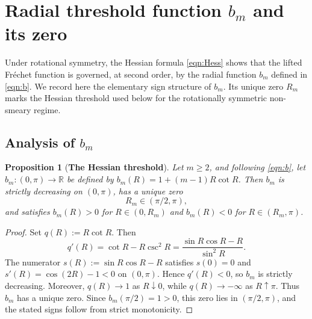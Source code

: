 \documentclass{amsart}
\newtheorem{proposition}[theorem]{Proposition}
\theoremstyle{definition}
\theoremstyle{remark}
\newcommand\0{\boldsymbol{0}}
\begin{document}
\section{Radial threshold function \(b_m\) and its zero}
\label{scn:asymptotics-b-h}

Under rotational symmetry, the Hessian formula \eqref{eqn:Hess} shows that the lifted Fr\'echet function is governed, at second order, by the radial function \(b_m\) defined in \eqref{eqn:b}.  We record here the elementary sign structure of \(b_m\).  Its unique zero \(R_m\) marks the Hessian threshold used below for the rotationally symmetric non-smeary regime.

\subsection{Analysis of \(b_m\)}

\begin{proposition}[\textbf{The Hessian threshold}]
\label{prop:zero_bm}
Let \(m\ge2\), and following \eqref{eqn:b}, let \(b_m:(0,\pi)\to\mathbb R\) be defined by \(b_m(R)=1+(m-1)R\cot R\).  Then \(b_m\) is strictly decreasing on \((0,\pi)\), has a unique zero
\begin{equation}\label{eqn:R_m}
    R_m\in(\pi/2,\pi),
\end{equation}
and satisfies \(b_m(R)>0\) for \(R\in(0,R_m)\) and \(b_m(R)<0\) for \(R\in(R_m,\pi)\).
\end{proposition}

\begin{proof}
Set \(q(R):=R\cot R\). Then
\[
    q'(R)=\cot R-R\csc^2R=\frac{\sin R\cos R-R}{\sin^2R}.
\]
The numerator \(s(R):=\sin R\cos R-R\) satisfies \(s(0)=0\) and \(s'(R)=\cos(2R)-1<0\) on \((0,\pi)\).  Hence \(q'(R)<0\), so \(b_m\) is strictly decreasing.  Moreover, \(q(R)\to1\) as \(R\downarrow0\), while \(q(R)\to-\infty\) as \(R\uparrow\pi\).  Thus \(b_m\) has a unique zero.  Since \(b_m(\pi/2)=1>0\), this zero lies in \((\pi/2,\pi)\), and the stated signs follow from strict monotonicity.
\end{proof}

\end{document}
